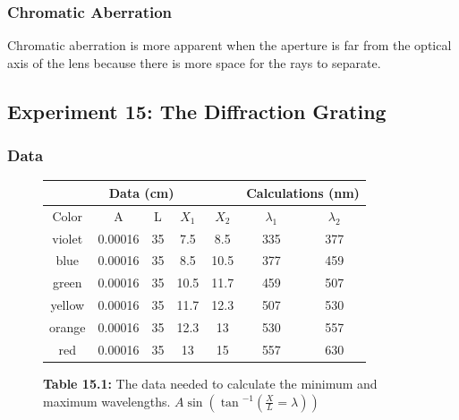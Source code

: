 \documentclass[12pt]{article}
\begin{document}
\subsubsection{Chromatic Aberration}

\subsubsubsection{}

Chromatic aberration is more apparent when the aperture is far from the optical
axis of the lens because there is more space for the rays to separate.



\subsection{Experiment 15: The Diffraction Grating}

\subsubsection{Data}

\begin{figure}[H]
  \label{tab:15.1}
  \caption{\textbf{Table 15.1:} The data needed to calculate the minimum and
    maximum wavelengths. \(A \sin{(\tan{}^{-1}(\frac{X}{L} = \lambda))}\)}
  \begin{center}
    \begin{tabular}{|ccccc|cc|}
      \hline
      \multicolumn{5}{|c|}{Data (\si{\centi\meter})} & 
      \multicolumn{2}{|c|}{Calculations (\si{\nano\meter})} \\
      \hline
      Color & A & L & \(X_1\) & \(X_2\) & \(\lambda_1\) & \(\lambda_2\) \\
      \hline
      violet & \num{0.00016} & 35 & 7.5  & 8.5  & 335 & 377 \\
      blue   & \num{0.00016} & 35 & 8.5  & 10.5 & 377 & 459 \\
      green  & \num{0.00016} & 35 & 10.5 & 11.7 & 459 & 507 \\
      yellow & \num{0.00016} & 35 & 11.7 & 12.3 & 507 & 530 \\
      orange & \num{0.00016} & 35 & 12.3 & 13   & 530 & 557 \\
      red    & \num{0.00016} & 35 & 13   & 15   & 557 & 630 \\
      \hline
    \end{tabular}
  \end{center}
\end{figure}
\end{document}

